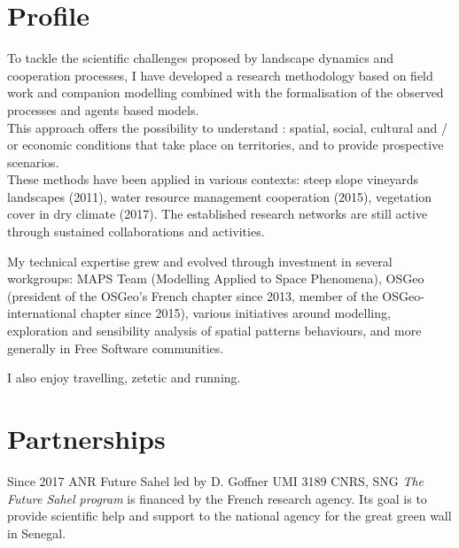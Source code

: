 \documentclass[]{cv-etienne}
\begin{document}
\section{Profile}
To tackle the scientific challenges proposed by landscape dynamics and cooperation processes, I have developed a research methodology based on field work and companion modelling combined with the formalisation of the observed processes and agents based models.\\
This approach offers the possibility to understand : spatial, social, cultural and / or economic conditions that take place on territories, and to provide prospective scenarios. \\
These methods have been applied in various contexts: steep slope vineyards landscapes (2011), water resource management cooperation (2015), vegetation cover in dry climate (2017). The established research networks are still active through sustained collaborations and activities.

My technical expertise grew and evolved through investment in several workgroups: MAPS Team (Modelling Applied to Space Phenomena), OSGeo (president of the OSGeo's French chapter since 2013, member of the OSGeo-international chapter since 2015), various initiatives around modelling, exploration and sensibility analysis of spatial patterns behaviours, and more generally in Free Software communities.

I also enjoy travelling, zetetic and running.
\vspace{2em}

\section{Partnerships}
\begin{entrylist}
\entry
{Since 2017}
{ANR Future Sahel {\normalfont led by D. Goffner}}
{UMI 3189 CNRS,  SNG}
{\emph{The Future Sahel program} is financed by the French research agency. Its goal is to provide scientific help and support to the national agency for the great green wall in Senegal.}
\end{entrylist}
\end{document}
